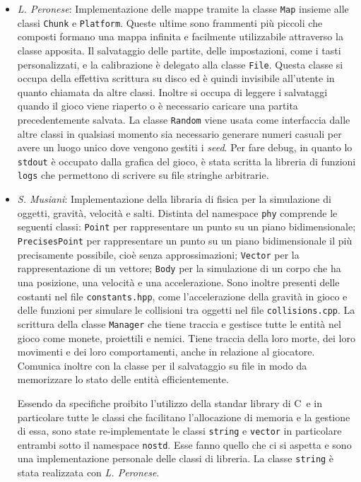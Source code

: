 \documentclass[a4paper]{article}
\def\CC{{C\nolinebreak[4]\hspace{-.05em}\raisebox{.4ex}{\tiny\bf ++}}}
\begin{document}
\begin{itemize}
  \item \emph{L. Peronese}: Implementazione delle mappe tramite la classe 
    \texttt{Map} insieme alle classi \texttt{Chunk} e \texttt{Platform}. Queste 
    ultime sono frammenti più piccoli che composti formano una mappa infinita  e 
    facilmente utilizzabile attraverso la classe apposita. Il salvataggio delle 
    partite, delle impostazioni, come i tasti personalizzati, e la calibrazione 
    è delegato alla classe \texttt{File}. Questa classe si occupa della 
    effettiva scrittura su disco ed è quindi invisibile all'utente in quanto 
    chiamata da altre classi. Inoltre si occupa di leggere i salvataggi quando 
    il gioco viene riaperto o è necessario caricare una partita precedentemente 
    salvata. La classe \texttt{Random} viene usata come interfaccia dalle altre
    classi in qualsiasi momento sia necessario generare numeri casuali per avere
    un luogo unico dove vengono gestiti i \emph{seed}. Per fare debug, in quanto
    lo \texttt{stdout} è occupato dalla grafica del gioco, è stata scritta la 
    libreria di funzioni \texttt{logs} che permettono di scrivere su file 
    stringhe arbitrarie.

  \item \emph{S. Musiani}: Implementazione della libraria di fisica per la 
    simulazione di oggetti, gravità, velocità e salti. Distinta del namespace 
    \texttt{phy} comprende le seguenti classi: \texttt{Point} per rappresentare 
    un punto su un piano bidimensionale; \texttt{PrecisesPoint} per 
    rappresentare un punto su un piano bidimensionale il più precisamente 
    possibile, cioè senza approssimazioni; \texttt{Vector} per la 
    rappresentazione di un vettore; \texttt{Body} per la simulazione di un 
    corpo che ha una posizione, una velocità e una accelerazione. Sono inoltre 
    presenti delle costanti nel file \texttt{constants.hpp}, come 
    l'accelerazione della gravità in gioco e delle funzioni per simulare le 
    collisioni tra oggetti nel file \texttt{collisions.cpp}. La scrittura della 
    classe \texttt{Manager} che tiene traccia e gestisce tutte le entità nel 
    gioco come monete, proiettili e nemici. Tiene traccia della loro morte, dei 
    loro movimenti e dei loro comportamenti, anche in relazione al giocatore. 
    Comunica inoltre con la classe per il salvataggio su file in modo da 
    memorizzare lo stato delle entità efficientemente.

    Essendo da specifiche proibito l'utilizzo della standar library di \CC\ e in
    particolare tutte le classi che facilitano l'allocazione di memoria e la 
    gestione di essa, sono state re-implementate le classi \texttt{string} e 
    \texttt{vector} in particolare entrambi sotto il namespace \texttt{nostd}. 
    Esse fanno quello che ci si aspetta e sono una implementazione personale 
    delle classi di libreria. La classe \texttt{string} è stata realizzata con 
    \emph{L. Peronese}.
\end{itemize}
\end{document}
